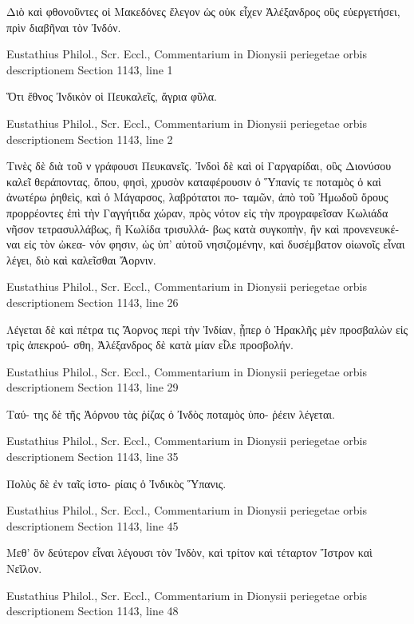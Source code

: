\documentclass[12pt,letterpaper,twoside,final]{memoir}
\begin{document}
\begin{greek}
Διὸ καὶ φθονοῦντες οἱ Μακεδόνες ἔλεγον ὡς οὐκ εἶχεν 
Ἀλέξανδρος οὓς εὐεργετήσει, πρὶν διαβῆναι τὸν Ἰνδόν. 



Eustathius Philol., Scr. Eccl., Commentarium in Dionysii periegetae orbis descriptionem 
Section 1143, line 1

Ὅτι ἔθνος Ἰνδικὸν οἱ Πευκαλεῖς, ἄγρια φῦλα. 



Eustathius Philol., Scr. Eccl., Commentarium in Dionysii periegetae orbis descriptionem 
Section 1143, line 2

Τινὲς δὲ διὰ τοῦ ν γράφουσι Πευκανεῖς. Ἰνδοὶ δὲ καὶ 
οἱ Γαργαρίδαι, οὓς Διονύσου καλεῖ θεράποντας, ὅπου, 
φησὶ, χρυσὸν καταφέρουσιν ὁ Ὕπανίς τε ποταμὸς ὁ 
καὶ ἀνωτέρω ῥηθεὶς, καὶ ὁ Μάγαρσος, λαβρότατοι πο-
ταμῶν, ἀπὸ τοῦ Ἠμωδοῦ ὄρους προρρέοντες ἐπὶ τὴν 
Γαγγήτιδα χώραν, πρὸς νότον εἰς τὴν προγραφεῖσαν 
Κωλιάδα νῆσον τετρασυλλάβως, ἢ Κωλίδα τρισυλλά-
βως κατὰ συγκοπὴν, ἣν καὶ προνενευκέναι εἰς τὸν ὠκεα-
νόν φησιν, ὡς ὑπ' αὐτοῦ νησιζομένην, καὶ δυσέμβατον 
οἰωνοῖς εἶναι λέγει, διὸ καὶ καλεῖσθαι Ἄορνιν. 



Eustathius Philol., Scr. Eccl., Commentarium in Dionysii periegetae orbis descriptionem 
Section 1143, line 26

Λέγεται δὲ καὶ πέτρα τις Ἄορνος περὶ τὴν Ἰνδίαν, 
ᾗπερ ὁ Ἡρακλῆς μὲν προσβαλὼν εἰς τρὶς ἀπεκρού-
σθη, Ἀλέξανδρος δὲ κατὰ μίαν εἷλε προσβολήν. 



Eustathius Philol., Scr. Eccl., Commentarium in Dionysii periegetae orbis descriptionem 
Section 1143, line 29

                                                      Ταύ-
της δὲ τῆς Ἀόρνου τὰς ῥίζας ὁ Ἰνδὸς ποταμὸς ὑπο-
ῥέειν λέγεται. 



Eustathius Philol., Scr. Eccl., Commentarium in Dionysii periegetae orbis descriptionem 
Section 1143, line 35

                                  Πολὺς δὲ ἐν ταῖς ἱστο-
ρίαις ὁ Ἰνδικὸς Ὕπανις. 



Eustathius Philol., Scr. Eccl., Commentarium in Dionysii periegetae orbis descriptionem 
Section 1143, line 45

Μεθ' ὃν δεύτερον εἶναι λέγουσι τὸν Ἰνδὸν, καὶ τρίτον 
καὶ τέταρτον Ἴστρον καὶ Νεῖλον. 



Eustathius Philol., Scr. Eccl., Commentarium in Dionysii periegetae orbis descriptionem 
Section 1143, line 48


\end{greek}
\end{document}
